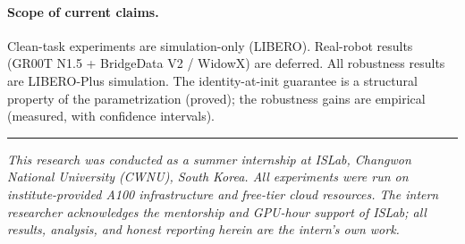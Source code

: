 \documentclass[11pt,a4paper]{article}
\begin{document}
\paragraph{Scope of current claims.}
Clean-task experiments are simulation-only (LIBERO). Real-robot results (GR00T N1.5 +
BridgeData V2 / WidowX) are deferred. All robustness results are LIBERO-Plus simulation.
The identity-at-init guarantee is a structural property of the parametrization (proved);
the robustness gains are empirical (measured, with confidence intervals).

\vspace{1em}
\noindent\rule{\textwidth}{0.4pt}
\begin{center}
\small\itshape
This research was conducted as a summer internship at ISLab, Changwon National University
(CWNU), South Korea. All experiments were run on institute-provided A100 infrastructure
and free-tier cloud resources. The intern researcher acknowledges the mentorship and
GPU-hour support of ISLab; all results, analysis, and honest reporting herein are the
intern's own work.
\end{center}

\end{document}

